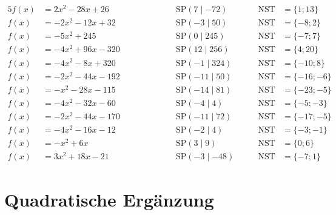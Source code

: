 \documentclass
[
  draft    = true,
  fontsize = 11pt,
  parskip  = half-,
  BCOR     = 0pt,
  DIV      = 11
]
{scrartcl}
\begin{document}
\begin{alignat*}{5}
  f(x)&=2x^{2}-28x+26 \qquad&\qquad \quad&\text{SP}(7\mid-72) \quad&\quad \text{NST}&=\{1;13\} \\[0.5ex]
  f(x)&=-2x^{2}-12x+32 \qquad&\qquad \quad&\text{SP}(-3\mid50) \quad&\quad \text{NST}&=\{-8;2\} \\[0.5ex]
  f(x)&=-5x^{2}+245 \qquad&\qquad \quad&\text{SP}(0\mid245) \quad&\quad \text{NST}&=\{-7;7\} \\[0.5ex]
  f(x)&=-4x^{2}+96x-320 \qquad&\qquad \quad&\text{SP}(12\mid256) \quad&\quad \text{NST}&=\{4;20\} \\[0.5ex]
  f(x)&=-4x^{2}-8x+320 \qquad&\qquad \quad&\text{SP}(-1\mid324) \quad&\quad \text{NST}&=\{-10;8\} \\[0.5ex]
  f(x)&=-2x^{2}-44x-192 \qquad&\qquad \quad&\text{SP}(-11\mid50) \quad&\quad \text{NST}&=\{-16;-6\} \\[0.5ex]
  f(x)&=-x^{2}-28x-115 \qquad&\qquad \quad&\text{SP}(-14\mid81) \quad&\quad \text{NST}&=\{-23;-5\} \\[0.5ex]
  f(x)&=-4x^{2}-32x-60 \qquad&\qquad \quad&\text{SP}(-4\mid4) \quad&\quad \text{NST}&=\{-5;-3\} \\[0.5ex]
  f(x)&=-2x^{2}-44x-170 \qquad&\qquad \quad&\text{SP}(-11\mid72) \quad&\quad \text{NST}&=\{-17;-5\} \\[0.5ex]
  f(x)&=-4x^{2}-16x-12 \qquad&\qquad \quad&\text{SP}(-2\mid4) \quad&\quad \text{NST}&=\{-3;-1\} \\[0.5ex]
  f(x)&=-x^{2}+6x \qquad&\qquad \quad&\text{SP}(3\mid9) \quad&\quad \text{NST}&=\{0;6\} \\[0.5ex]
  f(x)&=3x^{2}+18x-21 \qquad&\qquad \quad&\text{SP}(-3\mid-48) \quad&\quad \text{NST}&=\{-7;1\}
\end{alignat*}

\clearpage
\section*{Quadratische Ergänzung}
\end{document}
